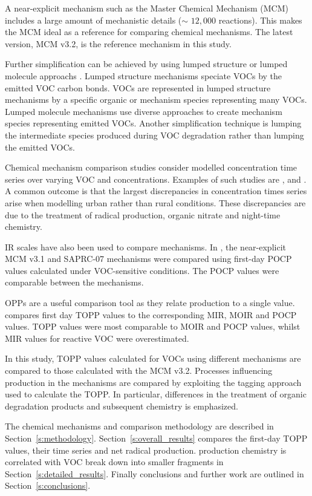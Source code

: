 A near-explicit mechanism such as the Master Chemical Mechanism (MCM) \citep{Jenkin:2003, Saunders:2003, Bloss:2005} includes a large amount of mechanistic details ($\sim$ $12,000$ reactions). 
This makes the MCM ideal as a reference for comparing chemical mechanisms.
The latest version, MCM v3.2, \citep{MCM_Site} is the reference mechanism in this study.

Further simplification can be achieved by using lumped structure or lumped molecule approachs \citep{Dodge:2000}. 
Lumped structure mechanisms speciate VOCs by the emitted VOC carbon bonds.
VOCs are represented in lumped structure mechanisms by a specific organic or mechanism species representing many VOCs. 
Lumped molecule mechanisms use diverse approaches to create mechanism species representing emitted VOCs.  
Another simplification technique is lumping the intermediate species produced during VOC degradation rather than lumping the emitted VOCs.

Chemical mechanism comparison studies consider modelled  concentration time series over varying VOC and  concentrations. 
Examples of such studies are \citet{Dunker:1984}, \citet{Kuhn:1998} and \citet{Emmerson:2009}.
A common outcome is that the largest discrepancies in  concentration times series arise when modelling urban rather than rural conditions.
These discrepancies are due to the treatment of radical production, organic nitrate and night-time chemistry.

IR scales have also been used to compare mechanisms.
In \citet{Derwent:2010}, the near-explicit MCM v3.1 and SAPRC-07 mechanisms were compared using first-day POCP values calculated under VOC-sensitive conditions. 
The POCP values were comparable between the mechanisms. 

OPPs are a useful comparison tool as they relate  production to a single value. 
\citet{Butler:2011} compares first day TOPP values to the corresponding MIR, MOIR and POCP values.
TOPP values were most comparable to MOIR and POCP values, whilst MIR values for reactive VOC were overestimated.

In this study, TOPP values calculated for VOCs using different mechanisms are compared to those calculated with the MCM v3.2. 
Processes influencing  production in the mechanisms are compared by exploiting the tagging approach used to calculate the TOPP.
In particular, differences in the treatment of organic degradation products and subsequent chemistry is emphasized.

The chemical mechanisms and comparison methodology are described in \mbox{Section \ref{s:methodology}}. 
\mbox{Section \ref{s:overall_results}} compares the first-day TOPP values, their time series and net radical production. 
 production chemistry is correlated with VOC break down into smaller fragments in \mbox{Section \ref{s:detailed_results}}. 
Finally conclusions and further work are outlined in \mbox{Section \ref{s:conclusions}}.  
